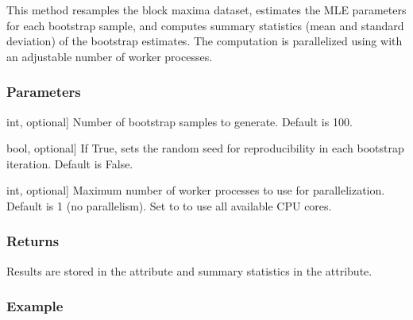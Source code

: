 \documentclass[a4paper,11pt,openany,english]{sphinxmanual}
\begin{document}
\begin{fulllineitems}
\begin{fulllineitems}
\sphinxAtStartPar
This method resamples the block maxima dataset, estimates the MLE parameters for each bootstrap sample,
and computes summary statistics (mean and standard deviation) of the bootstrap estimates. The computation
is parallelized using  with an adjustable number of worker processes.


\subsubsection{Parameters}
\label{\detokenize{api_bootstrap:id4}}\begin{description}
\sphinxlineitem{num\_bootstraps}{[}int, optional{]}
\sphinxAtStartPar
Number of bootstrap samples to generate. Default is 100.

\sphinxlineitem{set\_seeds}{[}bool, optional{]}
\sphinxAtStartPar
If True, sets the random seed for reproducibility in each bootstrap iteration. Default is False.

\sphinxlineitem{max\_workers}{[}int, optional{]}
\sphinxAtStartPar
Maximum number of worker processes to use for parallelization. Default is 1 (no parallelism).
Set to  to use all available CPU cores.

\end{description}


\subsubsection{Returns}
\label{\detokenize{api_bootstrap:id5}}\begin{description}
\sphinxAtStartPar
Results are stored in the  attribute and summary statistics in the  attribute.

\end{description}


\subsubsection{Example}
\label{\detokenize{api_bootstrap:id6}}
\begin{sphinxVerbatim}[commandchars=\\\{\}]
  
\PYG{p}{[}\PYG{p}{]}  
\PYG{p}{[}\PYG{p}{]}   
\end{sphinxVerbatim}


\end{fulllineitems}
\end{fulllineitems}
\end{document}
